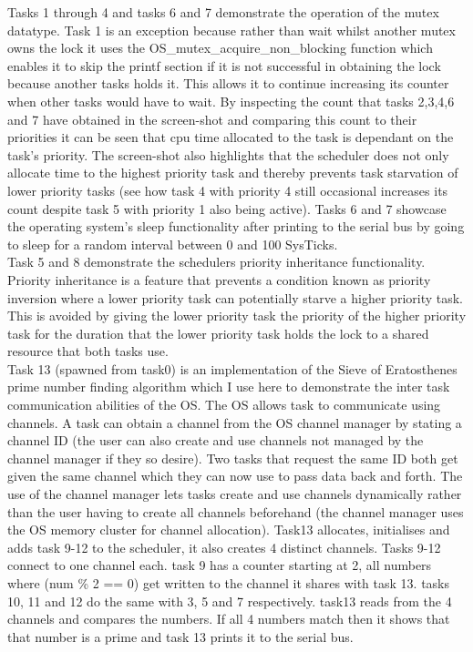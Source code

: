\documentclass[12pt,a4paper]{article}
\begin{document}
Tasks 1 through 4 and tasks 6 and 7 demonstrate the operation of the mutex datatype. Task 1 is an exception because rather than wait whilst another mutex owns the lock it uses the OS\_mutex\_acquire\_non\_blocking function which enables it to skip the printf section if it is not successful in obtaining the lock because another tasks holds it. This allows it to continue increasing its counter when other tasks would have to wait. By inspecting the count that tasks 2,3,4,6 and 7 have obtained in the screen-shot and comparing this count to their priorities it can be seen that cpu time allocated to the task is dependant on the task's priority. The screen-shot also highlights that the scheduler does not only allocate time to the highest priority task and thereby prevents task starvation of lower priority tasks (see how task 4 with priority 4 still occasional increases its count despite task 5 with priority 1 also being active). Tasks 6 and 7 showcase the operating system's sleep functionality after printing to the serial bus by going to sleep for a random interval between 0 and 100 SysTicks.\\

Task 5 and 8 demonstrate the schedulers priority inheritance functionality. Priority inheritance is a feature that prevents a condition known as priority inversion where a lower priority task can potentially starve a higher priority task. This is avoided by giving the lower priority task the priority of the higher priority task for the duration that the lower priority task holds the lock to a shared resource that both tasks use. \\

Task 13 (spawned from task0) is an implementation of the Sieve of Eratosthenes prime number finding algorithm which I use here to demonstrate the inter task communication abilities of the OS. The OS allows task to communicate using channels. A task can obtain a channel from the OS channel manager by stating a channel ID (the user can also create and use channels not managed by the channel manager if they so desire). Two tasks that request the same ID both get given the same channel which they can now use to pass data back and forth. The use of the channel manager lets tasks create and use channels dynamically rather than the user having to create all channels beforehand (the channel manager uses the OS memory cluster for channel allocation). Task13 allocates, initialises and adds task 9-12 to the scheduler, it also creates 4 distinct channels. Tasks 9-12 connect to one channel each. task 9 has a counter starting at 2, all numbers where (num \% 2 == 0) get written to the channel it shares with task 13. tasks 10, 11 and 12 do the same with 3, 5 and 7 respectively. task13 reads from the 4 channels and compares the numbers. If all 4 numbers match then it shows that that number is a prime and task 13 prints it to the serial bus.
\end{document}
